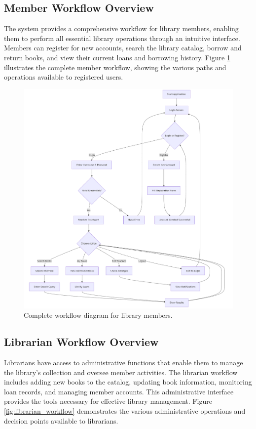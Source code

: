 \newpage

\subsection{Member Workflow Overview}
The system provides a comprehensive workflow for library members, enabling them to perform all essential library operations through an intuitive interface. Members can register for new accounts, search the library catalog, borrow and return books, and view their current loans and borrowing history. Figure \ref{fig:member_workflow} illustrates the complete member workflow, showing the various paths and operations available to registered users.

\begin{figure}[H]
	\centering
	\includegraphics[width=\textwidth]{figures/member_workflow.png}
	\caption{Complete workflow diagram for library members.}
	\label{fig:member_workflow}
\end{figure}

\newpage

\subsection{Librarian Workflow Overview}
Librarians have access to administrative functions that enable them to manage the library's collection and oversee member activities. The librarian workflow includes adding new books to the catalog, updating book information, monitoring loan records, and managing member accounts. This administrative interface provides the tools necessary for effective library management. Figure \ref{fig:librarian_workflow} demonstrates the various administrative operations and decision points available to librarians.

